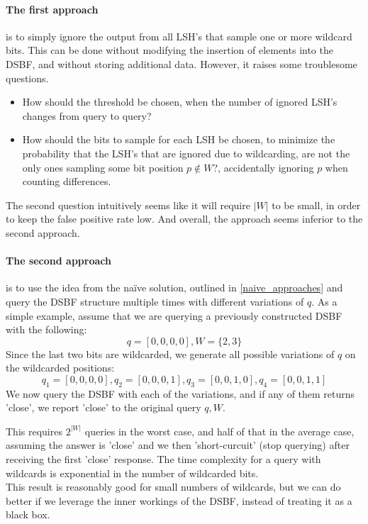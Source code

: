 \documentclass[a4paper,11pt]{article}
\begin{document}
\paragraph{The first approach} is to simply ignore the output from all LSH's that sample one or more wildcard bits. This can be done without modifying the insertion of elements into the DSBF, and without storing additional data. However, it raises some troublesome questions.

\begin{itemize}
\item How should the threshold be chosen, when the number of ignored LSH's changes from query to query?
\item How should the bits to sample for each LSH be chosen, to minimize the probability that the LSH's that are ignored due to wildcarding, are not the only ones sampling some bit position $p \notin W$?, accidentally ignoring $p$ when counting differences.
\end{itemize}

The second question intuitively seems like it will require $|W|$ to be small, in order to keep the false positive rate low. And overall, the approach seems inferior to the second approach.

\paragraph{The second approach} is to use the idea from the naïve solution, outlined in \ref{naive_approaches} and query the DSBF structure multiple times with different variations of $q$. As a simple example, assume that we are querying a previously constructed DSBF with the following:
\[q=[0,0,0,0], W=\{2,3\}\]
Since the last two bits are wildcarded, we generate all possible variations of $q$ on the wildcarded positions:
\[q_1=[0,0,0,0], q_2=[0,0,0,1], q_3=[0,0,1,0], q_4=[0,0,1,1]\]
We now query the DSBF with each of the variations, and if any of them returns 'close', we report 'close' to the original query $q, W$.

This requires $2^{|W|}$ queries in the worst case, and half of that in the average case, assuming the answer is 'close' and we then 'short-curcuit' (stop querying) after receiving the first 'close' response. The time complexity for a query with wildcards is exponential in the number of wildcarded bits.\\

This result is reasonably good for small numbers of wildcards, but we can do better if we leverage the inner workings of the DSBF, instead of treating it as a black box.\\
\end{document}
